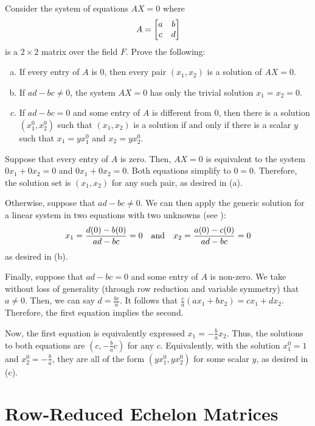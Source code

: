 \documentclass[notes]{agony}
\begin{document}
\begin{xca}
  Consider the system of equations $AX = 0$ where \[ A = \mqty[a&b \\ c&d] \]
  is a $2 \times 2$ matrix over the field $F$. Prove the following:
  \setlength\parskip{0pt}
  \begin{enumerate}[(a)]
    \item If every entry of $A$ is 0, then every pair $(x_1, x_2)$ is a solution of $AX = 0$.
    \item If $ad-bc \neq 0$, the system $AX = 0$ has only the trivial solution $x_1 = x_2 = 0$.
    \item If $ad-bc = 0$ and some entry of $A$ is different from 0,
          then there is a solution $(x_1^0, x_2^0)$ such that
          $(x_1, x_2)$ is a solution if and only if there is a scalar $y$ such that
          $x_1 = yx_1^0$ and $x_2 = yx_2^0$.
  \end{enumerate}
\end{xca}
\begin{prf}
  Suppose that every entry of $A$ is zero.
  Then, $AX = 0$ is equivalent to the system $0x_1 + 0x_2 = 0$ and $0x_1 + 0x_2 = 0$.
  Both equations simplify to $0 = 0$.
  Therefore, the solution set is $(x_1, x_2)$ for any such pair, as desired in (a).

  Otherwise, suppose that $ad - bc \neq 0$.
  We can then apply the generic solution for a linear system in two equations with two unknowns
  (see ):
  \[ x_1 = \frac{d(0) - b(0)}{ad - bc} = 0 \qq{and} x_2 = \frac{a(0) - c(0)}{ad - bc} = 0 \]
  as desired in (b).

  Finally, suppose that $ad - bc = 0$ and some entry of $A$ is non-zero.
  We take without loss of generality (through row reduction and variable symmetry) that $a \neq 0$.
  Then, we can say $d = \frac{bc}{a}$.
  It follows that $\frac{c}{a}(ax_1 + bx_2) = cx_1 + dx_2$.
  Therefore, the first equation implies the second.

  Now, the first equation is equivalently expressed $x_1 = -\frac{b}{a}x_2$.
  Thus, the solutions to both equations are $(c, -\frac{b}{a}c)$ for any $c$.
  Equivalently, with the solution $x_1^0 = 1$ and $x_2^0 = -\frac{b}{a}$,
  they are all of the form $(yx_1^0, yx_2^0)$ for some scalar $y$, as desired in (c).
\end{prf}

\section{Row-Reduced Echelon Matrices}
\end{document}
